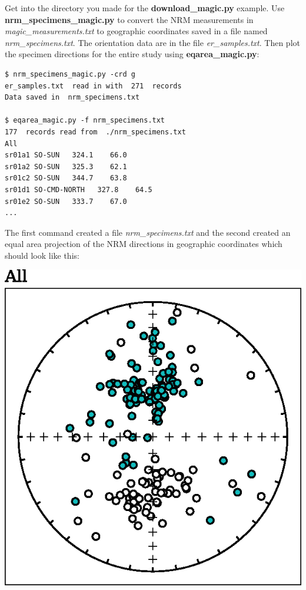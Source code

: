 \documentclass[11pt]{book}
\begin{document}
{{Get into the directory you made for the {\bf download\_magic.py} example.   \newline Use {\bf nrm\_specimens\_magic.py} to convert the NRM measurements in  {\it magic\_measurements.txt }   to geographic coordinates saved in a file named {\it nrm\_specimens.txt}.  The orientation data are in the file {\it er\_samples.txt}.    Then plot the specimen directions for the entire study using {\bf eqarea\_magic.py}:


 \begin{verbatim}
$ nrm_specimens_magic.py -crd g
er_samples.txt  read in with  271  records
Data saved in  nrm_specimens.txt

$ eqarea_magic.py -f nrm_specimens.txt
177  records read from  ./nrm_specimens.txt
All
sr01a1 SO-SUN   324.1    66.0
sr01a2 SO-SUN   325.3    62.1
sr01c2 SO-SUN   344.7    63.8
sr01d1 SO-CMD-NORTH   327.8    64.5
sr01e2 SO-SUN   333.7    67.0
...

 \end{verbatim}

 The first command created a file {\it nrm\_specimens.txt} and the second created an equal area projection of the NRM directions in geographic coordinates which should look like this:

\includegraphics[width=12 cm]{EPSfiles/nrm-eq.eps}
%


}}
\end{document}
